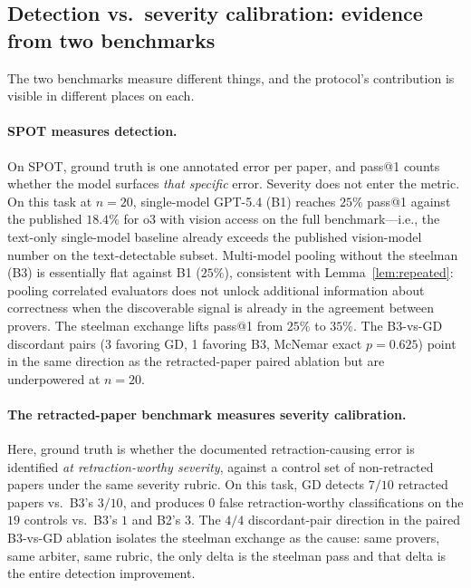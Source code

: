 \documentclass[11pt]{article}
\theoremstyle{definition}
\begin{document}
\subsection{Detection vs.\ severity calibration: evidence from two benchmarks}
\label{sec:discussion:two_benchmarks}

The two benchmarks measure different things, and the protocol's contribution is visible in different places on each.

\paragraph{SPOT measures detection.} On SPOT, ground truth is one annotated error per paper, and pass@1 counts whether the model surfaces \emph{that specific} error. Severity does not enter the metric. On this task at $n=20$, single-model GPT-5.4 (B1) reaches $25\%$ pass@1 against the published $18.4\%$ for o3 with vision access on the full benchmark---i.e., the text-only single-model baseline already exceeds the published vision-model number on the text-detectable subset. Multi-model pooling without the steelman (B3) is essentially flat against B1 ($25\%$), consistent with Lemma~\ref{lem:repeated}: pooling correlated evaluators does not unlock additional information about correctness when the discoverable signal is already in the agreement between provers. The steelman exchange lifts pass@1 from $25\%$ to $35\%$. The B3-vs-GD discordant pairs (3 favoring GD, 1 favoring B3, McNemar exact $p=0.625$) point in the same direction as the retracted-paper paired ablation but are underpowered at $n=20$.

\paragraph{The retracted-paper benchmark measures severity calibration.} Here, ground truth is whether the documented retraction-causing error is identified \emph{at retraction-worthy severity}, against a control set of non-retracted papers under the same severity rubric. On this task, GD detects $7/10$ retracted papers vs.\ B3's $3/10$, and produces $0$ false retraction-worthy classifications on the $19$ controls vs.\ B3's $1$ and B2's $3$. The $4/4$ discordant-pair direction in the paired B3-vs-GD ablation isolates the steelman exchange as the cause: same provers, same arbiter, same rubric, the only delta is the steelman pass and that delta is the entire detection improvement.
\end{document}
